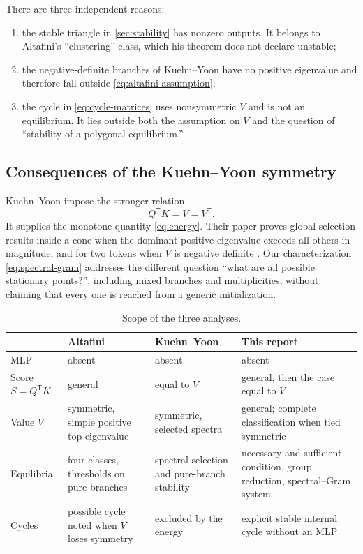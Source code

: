 \documentclass[11pt,a4paper]{article}
\theoremstyle{definition}
\newcommand{\T}{\mathsf T}
\begin{document}
There are three independent reasons:
\begin{enumerate}
  \item the stable triangle in \cref{sec:stability} has nonzero outputs. It belongs to
  Altafini's ``clustering'' class, which his theorem does not declare unstable;
  \item the negative-definite branches of Kuehn--Yoon have no positive eigenvalue and
  therefore fall outside \eqref{eq:altafini-assumption};
  \item the cycle in \eqref{eq:cycle-matrices} uses nonsymmetric $V$ and is not an
  equilibrium. It lies outside both the assumption on $V$ and the question of
  ``stability of a polygonal equilibrium.''
\end{enumerate}

\subsection{Consequences of the Kuehn--Yoon symmetry}

Kuehn--Yoon impose the stronger relation
\[
 Q^{\T}K=V=V^{\T}.
\]
It supplies the monotone quantity \eqref{eq:energy}. Their paper proves global
selection results inside a cone when the dominant positive eigenvalue exceeds all
others in magnitude, and for two tokens when $V$ is negative definite
\cite{kuehnyoon2026spectral}. Our characterization \eqref{eq:spectral-gram} addresses
the different question ``what are all possible stationary points?'', including mixed
branches and multiplicities, without claiming that every one is reached from a generic
initialization.

\begin{table}[ht]
\centering
\caption{Scope of the three analyses.}
\label{tab:scope}
\begin{tabularx}{\textwidth}{@{}lYYY@{}}
\toprule
 & Altafini & Kuehn--Yoon & This report \\
\midrule
MLP & absent & absent & absent \\
Score $S=Q^{\T}K$ & general & equal to $V$ & general, then the case equal to $V$ \\
Value $V$ & symmetric, simple positive top eigenvalue & symmetric, selected spectra & general; complete classification when tied symmetric \\
Equilibria & four classes, thresholds on pure branches & spectral selection and pure-branch stability & necessary and sufficient condition, group reduction, spectral--Gram system \\
Cycles & possible cycle noted when $V$ loses symmetry & excluded by the energy & explicit stable internal cycle without an MLP \\
\bottomrule
\end{tabularx}
\end{table}
\end{document}
